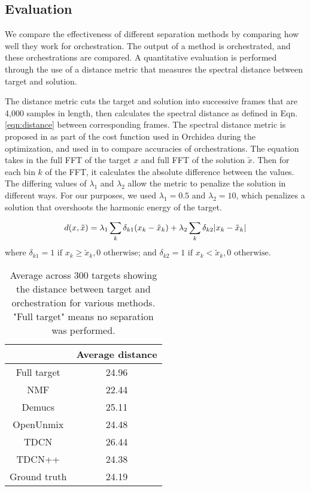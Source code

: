 \documentclass{article}
\begin{document}
		\subsection{Evaluation}
		We compare the effectiveness of different separation methods by comparing how well they work for orchestration. The output of a method is orchestrated, and these orchestrations are compared. A quantitative evaluation is performed through the use of a distance metric that measures the spectral distance between target and solution. 
		
		The distance metric cuts the target and solution into successive frames that are 4,000 samples in length, then calculates the spectral distance as defined in Eqn. \ref{eqn:distance} between corresponding frames. The spectral distance metric is proposed in \cite{Cella2020} as part of the cost function used in Orchidea during the optimization, and used in \cite{Cella2020b} to compare accuracies of orchestrations. The equation takes in the full FFT of the target $x$ and full FFT of the solution $\tilde{x}$. Then for each bin $k$ of the FFT, it calculates the absolute difference between the values. The differing values of $\lambda_1$ and $\lambda_2$ allow the metric to penalize the solution in different ways. For our purposes, we used $\lambda_1 = 0.5$ and $\lambda_2 = 10$, which penalizes a solution that overshoots the harmonic energy of the target.
		
		\begin{equation}\label{eqn:distance}
d(x, \tilde{x}) =\lambda_1 \sum_k \delta_{k1}(x_k - \tilde{x}_k) + \lambda_2 \sum_k \delta_{k2}|x_k - \tilde{x	}_k| \\
\end{equation}
where $\delta_{k1} = 1 \text{  if  } x_k \ge \tilde{x}_k, 0 \text{  otherwise}$; and $\delta_{k2} = 1 \text{  if  } x_k < \tilde{x}_k, 0 \text{  otherwise}$.
	
	
	\begin{table}[t]
		\begin{center}
			\begin{tabular}{|c|c|}
				\hline
				& Average distance \\
				\hline
				Full target & 24.96 \\
				\hline
				NMF & 22.44 \\
				\hline
				Demucs & 25.11 \\
				\hline
				OpenUnmix & 24.48\\
				\hline
				TDCN & 26.44\\
				\hline
				TDCN++ & 24.38 \\
				\hline
				Ground truth & 24.19 \\
				\hline
			\end{tabular}
		\end{center}
		\caption{Average across 300 targets showing the distance between target and orchestration for various methods. "Full target" means no separation was performed.}
		\label{tab:distances}
	\end{table}
		
\end{document}
